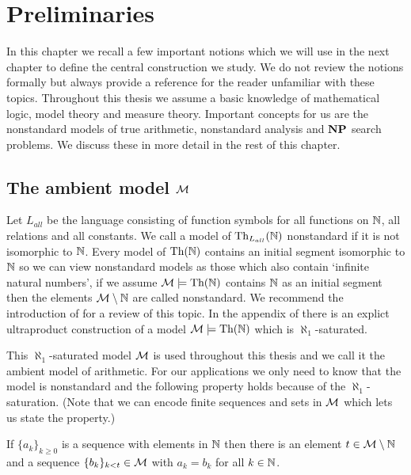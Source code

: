 \chapter*{Preliminaries}

In this chapter we recall a few important notions which we will use in the next chapter to define the central construction we study. We do not review the notions formally but always provide a reference for the reader unfamiliar with these topics. Throughout this thesis we assume a basic knowledge of mathematical logic, model theory and measure theory. Important concepts for us are the nonstandard models of true arithmetic, nonstandard analysis and $\textbf{NP}$ search problems. We discuss these in more detail in the rest of this chapter.

\section*{The ambient model $\mathcal{M}$}

Let $L_{all}$ be the language consisting of function symbols for all functions on $\mathbb{N}$, all relations and all constants. We call a model of $\text{Th}_{L_{all}}(\mathbb{N})$ nonstandard if it is not isomorphic to $\mathbb{N}$. Every model of $\text{Th}(\mathbb{N})$ contains an initial segment isomorphic to $\mathbb{N}$ so we can view nonstandard models as those which also contain `infinite natural numbers', if we assume $\mathcal{M}\models \text{Th}(\mathbb{N})$ contains $\mathbb{N}$ as an initial segment then the elements $\mathcal{M}\setminus \mathbb{N}$ are called nonstandard. We recommend the introduction of \cite{kaye1991pa} for a review of this topic. In the appendix of \cite{krajicek2010forcing} there is an explict ultraproduct construction of a model $\mathcal{M}\models \text{Th}(\mathbb{N})$ which is $\aleph_1$-saturated.

This $\aleph_1$-saturated model $\mathcal{M}$ is used throughout this thesis and we call it the ambient model of arithmetic. For our applications we only need to know that the model is nonstandard and the following property holds because of the $\aleph_1$-saturation. (Note that we can encode finite sequences and sets in $\mathcal{M}$ which lets us state the property.)

\begin{prope}
If $\{a_k\}_{k\geq 0}$ is a sequence with elements in $\mathbb{N}$ then there is an element $t\in \mathcal{M} \setminus \mathbb{N}$ and a sequence $\{b_k\}_{k<t}\in \mathcal{M}$ with $a_k=b_k$ for all $k\in \mathbb{N}$.
\end{prope}

